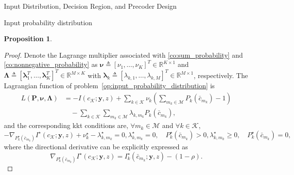 \documentclass[journal]{IEEEtran}
\newtheorem{proposition}{Proposition}
\begin{document}
\begin{section}{Input Distribution, Decision Region, and Precoder Design}
\begin{subsection}{Input probability distribution}
\begin{proposition}
				\label{pr:optimal_conditions}
			\end{proposition}
			\begin{proof}
				Denote the Lagrange multiplier associated with \eqref{co:sum_probability} and \eqref{co:nonnegative_probability} as $\boldsymbol{\nu} \triangleq [\nu_1,\ldots,\nu_K]^T \in \mathbb{R}^{K \times 1}$ and $\boldsymbol{\Lambda} \triangleq [\boldsymbol{\lambda}_1^T,\ldots,\boldsymbol{\lambda}_K^T]^T \in \mathbb{R}^{M \times K}$ with $\boldsymbol{\lambda}_k \triangleq [\lambda_{k,1},\ldots,\lambda_{k,M}]^T \in \mathbb{R}^{M \times 1}$, respectively. The Lagrangian function of problem~\eqref{op:input_probability_distribution} is
				\begin{align}
					L(\boldsymbol{P},\boldsymbol{\nu},\boldsymbol{\Lambda})
					& = - I(c_{\mathcal{K}};\boldsymbol{y},z) + \sum_{k \in \mathcal{K}} \nu_k \left( \sum_{m_k \in \mathcal{M}} P_k(\bar{c}_{m_k}) - 1 \right)\nonumber\\
					& \quad - \sum_{k \in \mathcal{K}} \sum_{m_k \in \mathcal{M}} \lambda_{k,m_k} P_k(\bar{c}_{m_k}),
				\end{align}
				and the corresponding \gls{kkt} conditions are, $\forall m_k \in \mathcal{M}$ and $\forall k \in \mathcal{K}$,
				\begin{subequations}
					\begin{equation}
						- \nabla_{P_k^{\star}(\bar{c}_{m_k})} I^{\star}(c_{\mathcal{K}};\boldsymbol{y},z) + \nu_k^{\star} - \lambda_{k,m_k}^{\star} = 0,
					\end{equation}
					\begin{equation}
						\lambda_{k,m_k}^{\star} = 0, \quad P_k^{\star}(\bar{c}_{m_k}) > 0,
					\end{equation}
					\begin{equation}
						\lambda_{k,m_k}^{\star} \ge 0, \quad P_k^{\star}(\bar{c}_{m_k}) = 0,
					\end{equation}
				\end{subequations}
				where the directional derivative can be explicitly expressed as
				\begin{equation}
					\nabla_{P_k^{\star}(\bar{c}_{m_k})} I^{\star}(c_{\mathcal{K}};\boldsymbol{y},z) = I_k^{\star}(\bar{c}_{m_k};\boldsymbol{y},z) - (1 - \rho).
				\end{equation}


\end{proof}
\end{subsection}
\end{section}
\end{document}

